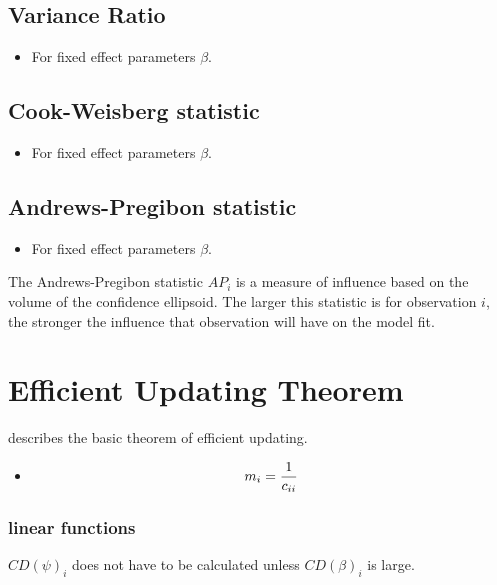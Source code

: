 \documentclass[12pt, a4paper]{article}
\begin{document}
\subsection{Variance Ratio} %
\begin{itemize}
	\item For fixed effect parameters $\beta$.
\end{itemize}

\subsection{Cook-Weisberg statistic} %
\begin{itemize}
	\item For fixed effect parameters $\beta$.
\end{itemize}

\subsection{Andrews-Pregibon statistic} %
\begin{itemize}
	\item For fixed effect parameters $\beta$.
\end{itemize}
The Andrews-Pregibon statistic $AP_{i}$ is a measure of influence based on the volume of the confidence ellipsoid.
The larger this statistic is for observation $i$, the stronger the influence that observation will have on the model fit.



\section{Efficient Updating Theorem} %
\citet{Zewotir} describes the basic theorem of efficient updating.
\begin{itemize}
	\item \[ m_i = {1 \over c_{ii}}\]
\end{itemize}





\subsubsection{linear functions}


$CD(\psi)_i$ does not have to be calculated unless $CD(\beta)_i$ is large.
\end{document}
